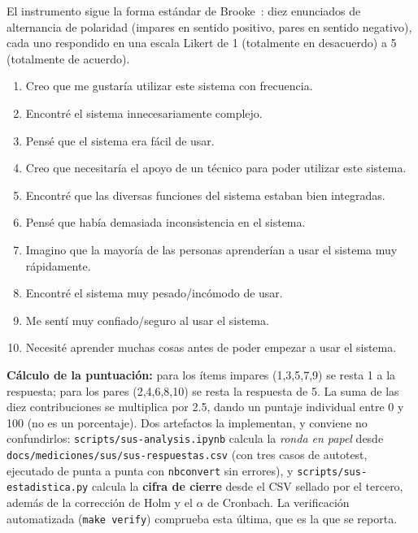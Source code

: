 El instrumento sigue la forma estándar de Brooke~\cite{brooke1996}: diez enunciados de alternancia de
polaridad (impares en sentido positivo, pares en sentido negativo), cada uno respondido en una escala
Likert de 1 (totalmente en desacuerdo) a 5 (totalmente de acuerdo).

\begin{enumerate}[nosep]
    \item Creo que me gustaría utilizar este sistema con frecuencia.
    \item Encontré el sistema innecesariamente complejo.
    \item Pensé que el sistema era fácil de usar.
    \item Creo que necesitaría el apoyo de un técnico para poder utilizar este sistema.
    \item Encontré que las diversas funciones del sistema estaban bien integradas.
    \item Pensé que había demasiada inconsistencia en el sistema.
    \item Imagino que la mayoría de las personas aprenderían a usar el sistema muy rápidamente.
    \item Encontré el sistema muy pesado/incómodo de usar.
    \item Me sentí muy confiado/seguro al usar el sistema.
    \item Necesité aprender muchas cosas antes de poder empezar a usar el sistema.
\end{enumerate}

\textbf{Cálculo de la puntuación:} para los ítems impares (1,3,5,7,9) se resta 1 a la respuesta; para los
pares (2,4,6,8,10) se resta la respuesta de 5. La suma de las diez contribuciones se multiplica por 2.5,
dando un puntaje individual entre 0 y 100 (no es un porcentaje). Dos artefactos la implementan, y
conviene no confundirlos: \texttt{scripts/sus-analysis.ipynb} calcula la \emph{ronda en papel} desde
\texttt{docs/mediciones/sus/sus-respuestas.csv} (con tres casos de autotest, ejecutado de punta a punta
con \texttt{nbconvert} sin errores), y \texttt{scripts/sus-estadistica.py} calcula la \textbf{cifra de
cierre} desde el CSV sellado por el tercero, además de la corrección de Holm y el $\alpha$ de Cronbach.
La verificación automatizada (\texttt{make verify}) comprueba esta última, que es la que se reporta.

